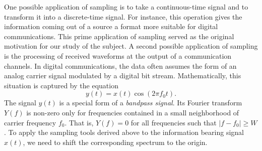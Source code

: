 One possible application of sampling is to take a continuous-time signal and to transform it into a discrete-time signal.
For instance, this operation gives the information coming out of a source a format more suitable for digital communications.
This prime application of sampling served as the original motivation for our study of the subject.
A second possible application of sampling is the processing of received waveforms at the output of a communication channels.
In digital communications, the data often assumes the form of an analog carrier signal modulated by a digital bit stream.
Mathematically, this situation is captured by the equation
\begin{equation*}
y(t) = x(t) \cos (2 \pi f_0 t) .
\end{equation*}
The signal $y(t)$ is a special form of a \emph{bandpass signal}.
Its Fourier transform $Y(f)$ is non-zero only for frequencies contained in a small neighborhood of carrier frequency $f_0$.
That is, $Y(f) = 0$ for all frequencies such that $|f - f_0| \geq W$.
To apply the sampling tools derived above to the information bearing signal $x(t)$, we need to shift the corresponding spectrum to the origin.

